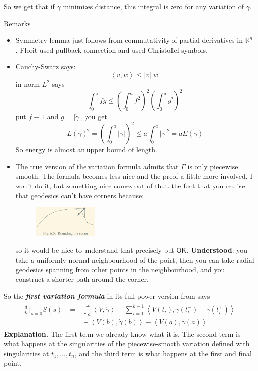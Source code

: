 So we get that if \(\gamma\) minimizes distance, this integral is zero for any variation of \(\gamma\).

\begin{thing8}{Remarks}\leavevmode
\begin{itemize}
\item Symmetry lemma just follows from commutativity of partial derivatives in \(\mathbb{R}^{n}\). Florit used pullback connection and \cite{ler} used Christoffel symbols.
\item Cauchy-Swarz says:
	\[\boxed{\left<v,w\right>\leq |v||w|}\]
	in norm \(L^2\) says
	\[\int_0^a fg\leq \left(\int_0^a f^2\right)^2 \left(\int_0^a g^2\right)^2\]
put \(f\equiv1\) and \(g=|\dot\gamma|\), you get
\[L(\gamma)^2=\left(\int_0^a |\dot\gamma|\right)^2 \leq a \int_0^a |\dot\gamma|^2=aE(\gamma)\]
So energy is almost an upper bound of length.
\item The true version of the variation formula admits that \(\Gamma\) is only piecewise smooth. The formula becomes less nice and the proof a little more involved, I won't do it, but something nice comes out of that: the fact that you realise that geodesics can't have corners because:
	\begin{figure}[H]
		\centering
		\includegraphics[width=0.3\textwidth]{fig3}
	\end{figure}
	so it would be nice to understand that precisely but \(\mathsf{OK}\). \textbf{Understood}: you take a uniformly normal neighbourhood of the point, then you can take radial geodesics spanning from other points in the neighbourhood, and you construct a shorter path around the corner.
\end{itemize}
\end{thing8}

So the \textit{\textbf{first variation formula}} in its full power version from \cite{ler} says
\begin{align*}
	\boxed{\begin{array}{rl}\frac{d}{ds}\Big|_{s=0}S(s)&=-\int_a^b\left<V,\ddot \gamma\right>-\sum_{i=1}^{k-1}\left<V(t_i),\dot\gamma(t_{i}^-)-\dot\gamma(t_{i}^+)\right>\\
				   & \qquad +\left<V(b),\dot\gamma(b)\right>-\left<V(a),\dot\gamma(a)\right>\end{array}}
	\end{align*}
\textbf{Explanation.} The first term we already know what it is. The second term is what happens at the singularities of the piecewise-smooth variation defined with singularities at \(t_1,\ldots,t_n\), and the third term is what happens at the first and final point.

